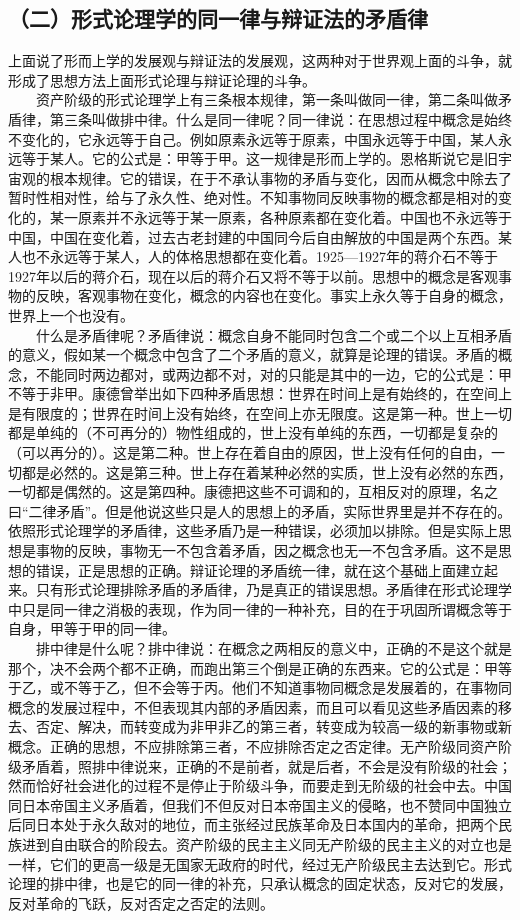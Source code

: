 \documentclass[cn,11pt,chinese]{elegantbook}
\def\myformat#1{\hfil\hfil #1}
\begin{document}
\subsection*{\myformat{（二）形式论理学的同一律与辩证法的矛盾律}}
上面说了形而上学的发展观与辩证法的发展观，这两种对于世界观上面的斗争，就形成了思想方法上面形式论理与辩证论理的斗争。\\
　　资产阶级的形式论理学上有三条根本规律，第一条叫做同一律，第二条叫做矛盾律，第三条叫做排中律。什么是同一律呢？同一律说：在思想过程中概念是始终不变化的，它永远等于自己。例如原素永远等于原素，中国永远等于中国，某人永远等于某人。它的公式是：甲等于甲。这一规律是形而上学的。恩格斯说它是旧宇宙观的根本规律。它的错误，在于不承认事物的矛盾与变化，因而从概念中除去了暂时性相对性，给与了永久性、绝对性。不知事物同反映事物的概念都是相对的变化的，某一原素并不永远等于某一原素，各种原素都在变化着。中国也不永远等于中国，中国在变化着，过去古老封建的中国同今后自由解放的中国是两个东西。某人也不永远等于某人，人的体格思想都在变化着。1925—1927年的蒋介石不等于1927年以后的蒋介石，现在以后的蒋介石又将不等于以前。思想中的概念是客观事物的反映，客观事物在变化，概念的内容也在变化。事实上永久等于自身的概念，世界上一个也没有。\\
　　什么是矛盾律呢？矛盾律说：概念自身不能同时包含二个或二个以上互相矛盾的意义，假如某一个概念中包含了二个矛盾的意义，就算是论理的错误。矛盾的概念，不能同时两边都对，或两边都不对，对的只能是其中的一边，它的公式是：甲不等于非甲。康德曾举出如下四种矛盾思想：世界在时间上是有始终的，在空间上是有限度的；世界在时间上没有始终，在空间上亦无限度。这是第一种。世上一切都是单纯的（不可再分的）物性组成的，世上没有单纯的东西，一切都是复杂的（可以再分的）。这是第二种。世上存在着自由的原因，世上没有任何的自由，一切都是必然的。这是第三种。世上存在着某种必然的实质，世上没有必然的东西，一切都是偶然的。这是第四种。康德把这些不可调和的，互相反对的原理，名之曰“二律矛盾”。但是他说这些只是人的思想上的矛盾，实际世界里是并不存在的。依照形式论理学的矛盾律，这些矛盾乃是一种错误，必须加以排除。但是实际上思想是事物的反映，事物无一不包含着矛盾，因之概念也无一不包含矛盾。这不是思想的错误，正是思想的正确。辩证论理的矛盾统一律，就在这个基础上面建立起来。只有形式论理排除矛盾的矛盾律，乃是真正的错误思想。矛盾律在形式论理学中只是同一律之消极的表现，作为同一律的一种补充，目的在于巩固所谓概念等于自身，甲等于甲的同一律。\\
　　排中律是什么呢？排中律说：在概念之两相反的意义中，正确的不是这个就是那个，决不会两个都不正确，而跑出第三个倒是正确的东西来。它的公式是：甲等于乙，或不等于乙，但不会等于丙。他们不知道事物同概念是发展着的，在事物同概念的发展过程中，不但表现其内部的矛盾因素，而且可以看见这些矛盾因素的移去、否定、解决，而转变成为非甲非乙的第三者，转变成为较高一级的新事物或新概念。正确的思想，不应排除第三者，不应排除否定之否定律。无产阶级同资产阶级矛盾着，照排中律说来，正确的不是前者，就是后者，不会是没有阶级的社会；然而恰好社会进化的过程不是停止于阶级斗争，而要走到无阶级的社会中去。中国同日本帝国主义矛盾着，但我们不但反对日本帝国主义的侵略，也不赞同中国独立后同日本处于永久敌对的地位，而主张经过民族革命及日本国内的革命，把两个民族进到自由联合的阶段去。资产阶级的民主主义同无产阶级的民主主义的对立也是一样，它们的更高一级是无国家无政府的时代，经过无产阶级民主去达到它。形式论理的排中律，也是它的同一律的补充，只承认概念的固定状态，反对它的发展，反对革命的飞跃，反对否定之否定的法则。\\
\end{document}
